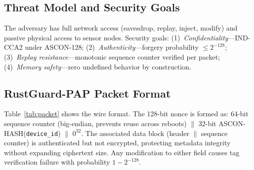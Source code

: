 \documentclass[anonymous]{ndss}
\begin{document}
\subsection{Threat Model and Security Goals}

The adversary has full network access (eavesdrop, replay, inject, modify)
and passive physical access to sensor nodes. Security goals:
(1)~\emph{Confidentiality}---IND-CCA2 under ASCON-128;
(2)~\emph{Authenticity}---forgery probability $\leq 2^{-128}$;
(3)~\emph{Replay resistance}---monotonic sequence counter verified per
packet; (4)~\emph{Memory safety}---zero undefined behavior by construction.

\subsection{RustGuard-PAP Packet Format}

\begin{table}[!t]
\centering
\caption{RustGuard-PAP Wire Format (40-byte fixed overhead)}
\label{tab:packet}
\renewcommand{\arraystretch}{1.15}
\footnotesize
{}
\end{table}

Table~\ref{tab:packet} shows the wire format. The 128-bit nonce is formed
as: 64-bit sequence counter (big-endian, prevents reuse across reboots) $\|$
32-bit ASCON-HASH(\texttt{device\_id}) $\|$ $0^{32}$.
The associated data block (header $\|$ sequence counter) is authenticated
but not encrypted, protecting metadata integrity without expanding
ciphertext size. Any modification to either field causes tag verification
failure with probability $1 - 2^{-128}$.
\end{document}
